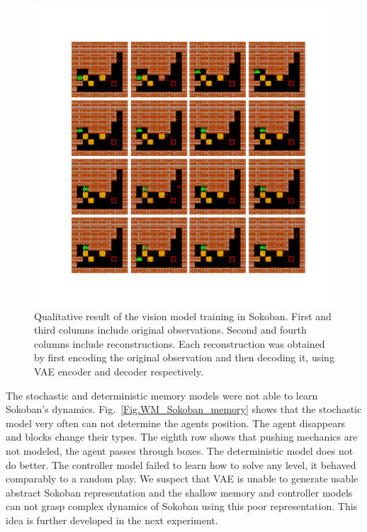 \begin{figure}[H]
\includegraphics[width=1\textwidth,keepaspectratio]{figures/Sokoban_vision.png}
\caption[Qualitative result of the World Models vision model training in Sokoban]{Qualitative result of the vision model training in Sokoban. First and third columns include original observations. Second and fourth columns include reconstructions. Each reconstruction was obtained by first encoding the original observation and then decoding it, using VAE encoder and decoder respectively.}
\label{Fig.WM_Sokoban_vision}
\end{figure}

The stochastic and deterministic memory models were not able to learn Sokoban’s dynamics. Fig.~\ref{Fig.WM_Sokoban_memory} shows that the stochastic model very often can not determine the agents position. The agent disappears and blocks change their types. The eighth row shows that pushing mechanics are not modeled, the agent passes through boxes. The deterministic model does not do better.
The controller model failed to learn how to solve any level, it behaved comparably to a random play. We suspect that VAE is unable to generate usable abstract Sokoban representation and the shallow memory and controller models can not grasp complex dynamics of Sokoban using this poor representation. This idea is further developed in the next experiment.

